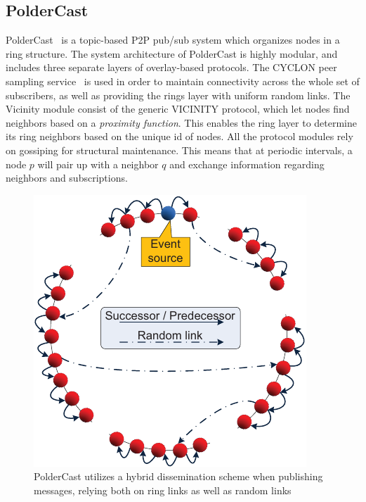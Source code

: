 \subsection{PolderCast}
PolderCast~\cite{Setty:2012} is a topic-based P2P pub/sub system which
organizes nodes in a ring structure. The system architecture of
PolderCast is highly modular, and includes three separate layers of
overlay-based protocols. The CYCLON peer sampling service~\cite{Voulgaris:2005} is used
in order to maintain connectivity across the whole set of subscribers,
as well as providing the rings layer with uniform random links. The
Vicinity module consist of the generic VICINITY protocol, which let
nodes find neighbors based on a \emph{proximity function}. This enables
the ring layer to determine its ring neighbors based on the unique id of
nodes. All the protocol modules rely on gossiping for structural
maintenance. This means that at periodic intervals, a node $p$ will pair up with a
neighbor $q$ and exchange information regarding neighbors and
subscriptions.

\begin{figure}[h]
    \centering
\includegraphics{img/hybrid_dissemination.pdf}
\caption{PolderCast utilizes a hybrid dissemination scheme when
    publishing messages, relying both on ring links as well as random
    links}
\end{figure}


